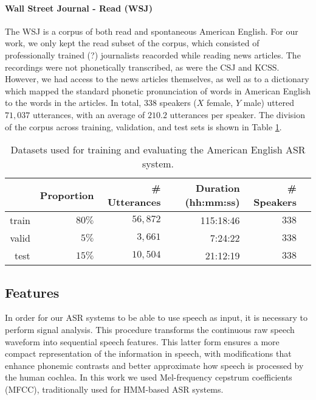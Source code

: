 \paragraph{Wall Street Journal - Read (WSJ)}
The WSJ \cite{} is a corpus of both read and spontaneous American English.
For our work, we only kept the read subset of the corpus, which consisted of {\color{red}professionally trained (?) journalists} reacorded while reading news articles. The recordings were not phonetically transcribed, as were the CSJ and KCSS. However, we had access to the news articles themselves, as well as to a dictionary which mapped the standard phonetic pronunciation of words in American English to the words in the articles.
In total, $338$ speakers {\color{red}($X$ female, $Y$ male)} uttered $71,037$ utterances, with an average of $210.2$ utterances per speaker. The division of the corpus across training, validation, and test sets is shown in Table \ref{tab:hmm_wsj}. 

\begin{table}[htb]
\centering
\caption{Datasets used for training and evaluating the American English ASR system.}
\label{tab:hmm_wsj}
\vspace{0.25cm}
\begin{tabular}{rrrrrr}
  \toprule
      & Proportion & \# Utterances & Duration (hh:mm:ss) & \# Speakers &  \\ \midrule
  train & $80\%$ &  $56,872$ &   115:18:46   &   $338$    &  \\
  valid & $5\%$ &  $3,661$ &  7:24:22  &  $338$  &  \\
  test  & $15\%$ &  $10,504$ & 21:12:19  & $338$    & \\ \bottomrule
\end{tabular}
\end{table}
      
\subsection{Features}
In order for our ASR systems to be able to use speech as input, it is necessary to perform signal analysis. This procedure transforms the continuous raw speech waveform into sequential speech features. This latter form ensures a more compact representation of the information in speech, with modifications that enhance phonemic contrasts and better approximate how speech is processed by the human cochlea. In this work we used Mel-frequency cepstrum coefficients (MFCC), traditionally used for HMM-based ASR systems.

